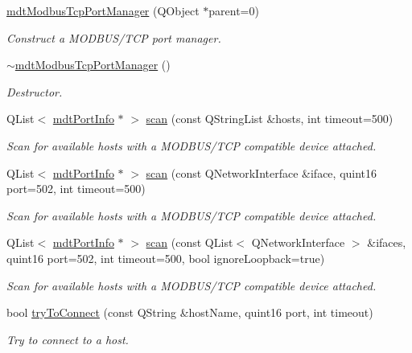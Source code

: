 \begin{DoxyCompactItemize}
\item 
\hyperlink{classmdt_modbus_tcp_port_manager_a2f65f779bbad19d9d3f85ef35220ffb8}{mdtModbusTcpPortManager} (QObject $\ast$parent=0)
\begin{DoxyCompactList}\small\item\em Construct a MODBUS/TCP port manager. \end{DoxyCompactList}\item 
\hyperlink{classmdt_modbus_tcp_port_manager_aabe51a50a53c6b23884cc4862730b731}{$\sim$mdtModbusTcpPortManager} ()
\begin{DoxyCompactList}\small\item\em Destructor. \end{DoxyCompactList}\item 
QList$<$ \hyperlink{classmdt_port_info}{mdtPortInfo} $\ast$ $>$ \hyperlink{classmdt_modbus_tcp_port_manager_a216ee2495440be4eefb2faf9da3c9e47}{scan} (const QStringList \&hosts, int timeout=500)
\begin{DoxyCompactList}\small\item\em Scan for available hosts with a MODBUS/TCP compatible device attached. \end{DoxyCompactList}\item 
QList$<$ \hyperlink{classmdt_port_info}{mdtPortInfo} $\ast$ $>$ \hyperlink{classmdt_modbus_tcp_port_manager_a7cfd5dcde142cd262925974b43e58bff}{scan} (const QNetworkInterface \&iface, quint16 port=502, int timeout=500)
\begin{DoxyCompactList}\small\item\em Scan for available hosts with a MODBUS/TCP compatible device attached. \end{DoxyCompactList}\item 
QList$<$ \hyperlink{classmdt_port_info}{mdtPortInfo} $\ast$ $>$ \hyperlink{classmdt_modbus_tcp_port_manager_a2f1128e1f564a785e35b2e9b16bc990f}{scan} (const QList$<$ QNetworkInterface $>$ \&ifaces, quint16 port=502, int timeout=500, bool ignoreLoopback=true)
\begin{DoxyCompactList}\small\item\em Scan for available hosts with a MODBUS/TCP compatible device attached. \end{DoxyCompactList}\item 
bool \hyperlink{classmdt_modbus_tcp_port_manager_ab04f69b660487a7c59d309df7a8f5baa}{tryToConnect} (const QString \&hostName, quint16 port, int timeout)
\begin{DoxyCompactList}\small\item\em Try to connect to a host. \end{DoxyCompactList}\item 

\end{DoxyCompactItemize}
